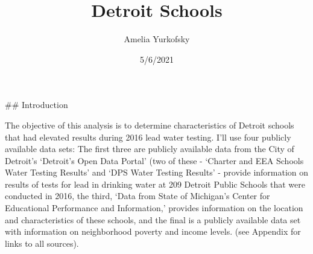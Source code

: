 \documentclass[
]{article}
\title{Detroit Schools}
\author{Amelia Yurkofsky}
\date{5/6/2021}
\newenvironment{Shaded}{\begin{snugshade}}{\end{snugshade}}
\newcommand{\CommentTok}[1]{\textcolor[rgb]{0.56,0.35,0.01}{\textit{#1}}}
\newcommand{\DecValTok}[1]{\textcolor[rgb]{0.00,0.00,0.81}{#1}}
\newcommand{\FunctionTok}[1]{\textcolor[rgb]{0.00,0.00,0.00}{#1}}
\newcommand{\NormalTok}[1]{#1}
\newcommand{\OtherTok}[1]{\textcolor[rgb]{0.56,0.35,0.01}{#1}}
\newcommand{\SpecialCharTok}[1]{\textcolor[rgb]{0.00,0.00,0.00}{#1}}
\newcommand{\StringTok}[1]{\textcolor[rgb]{0.31,0.60,0.02}{#1}}
\begin{document}
\maketitle

\#\# Introduction

The objective of this analysis is to determine characteristics of
Detroit schools that had elevated results during 2016 lead water
testing. I'll use four publicly available data sets: The first three are
publicly available data from the City of Detroit's `Detroit's Open Data
Portal' (two of these - `Charter and EEA Schools Water Testing Results'
and `DPS Water Testing Results' - provide information on results of
tests for lead in drinking water at 209 Detroit Public Schools that were
conducted in 2016, the third, `Data from State of Michigan's Center for
Educational Performance and Information,' provides information on the
location and characteristics of these schools, and the final is a
publicly available data set with information on neighborhood poverty and
income levels. (see Appendix for links to all sources).

\begin{Shaded}
\end{Shaded}
\end{document}
